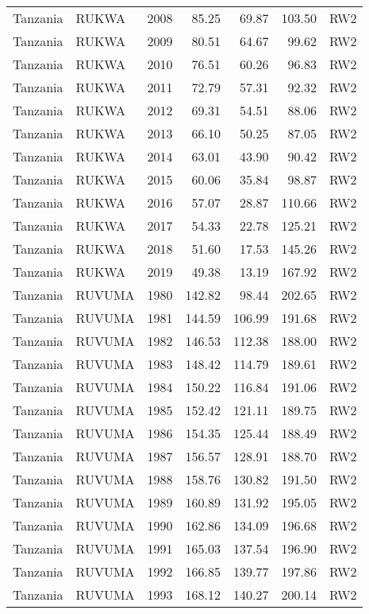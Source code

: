 \begin{longtable}{lllrrrl}
  Tanzania & RUKWA & 2008 & 85.25 & 69.87 & 103.50 & RW2 \\ 
  Tanzania & RUKWA & 2009 & 80.51 & 64.67 & 99.62 & RW2 \\ 
  Tanzania & RUKWA & 2010 & 76.51 & 60.26 & 96.83 & RW2 \\ 
  Tanzania & RUKWA & 2011 & 72.79 & 57.31 & 92.32 & RW2 \\ 
  Tanzania & RUKWA & 2012 & 69.31 & 54.51 & 88.06 & RW2 \\ 
  Tanzania & RUKWA & 2013 & 66.10 & 50.25 & 87.05 & RW2 \\ 
  Tanzania & RUKWA & 2014 & 63.01 & 43.90 & 90.42 & RW2 \\ 
  Tanzania & RUKWA & 2015 & 60.06 & 35.84 & 98.87 & RW2 \\ 
  Tanzania & RUKWA & 2016 & 57.07 & 28.87 & 110.66 & RW2 \\ 
  Tanzania & RUKWA & 2017 & 54.33 & 22.78 & 125.21 & RW2 \\ 
  Tanzania & RUKWA & 2018 & 51.60 & 17.53 & 145.26 & RW2 \\ 
  Tanzania & RUKWA & 2019 & 49.38 & 13.19 & 167.92 & RW2 \\ 
  Tanzania & RUVUMA & 1980 & 142.82 & 98.44 & 202.65 & RW2 \\ 
  Tanzania & RUVUMA & 1981 & 144.59 & 106.99 & 191.68 & RW2 \\ 
  Tanzania & RUVUMA & 1982 & 146.53 & 112.38 & 188.00 & RW2 \\ 
  Tanzania & RUVUMA & 1983 & 148.42 & 114.79 & 189.61 & RW2 \\ 
  Tanzania & RUVUMA & 1984 & 150.22 & 116.84 & 191.06 & RW2 \\ 
  Tanzania & RUVUMA & 1985 & 152.42 & 121.11 & 189.75 & RW2 \\ 
  Tanzania & RUVUMA & 1986 & 154.35 & 125.44 & 188.49 & RW2 \\ 
  Tanzania & RUVUMA & 1987 & 156.57 & 128.91 & 188.70 & RW2 \\ 
  Tanzania & RUVUMA & 1988 & 158.76 & 130.82 & 191.50 & RW2 \\ 
  Tanzania & RUVUMA & 1989 & 160.89 & 131.92 & 195.05 & RW2 \\ 
  Tanzania & RUVUMA & 1990 & 162.86 & 134.09 & 196.68 & RW2 \\ 
  Tanzania & RUVUMA & 1991 & 165.03 & 137.54 & 196.90 & RW2 \\ 
  Tanzania & RUVUMA & 1992 & 166.85 & 139.77 & 197.86 & RW2 \\ 
  Tanzania & RUVUMA & 1993 & 168.12 & 140.27 & 200.14 & RW2 \\ 

\end{longtable}
